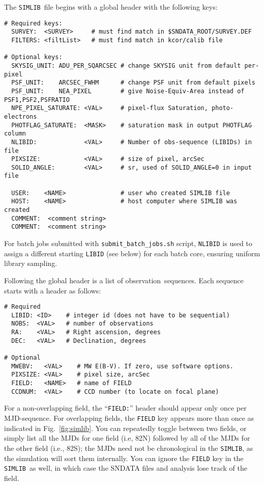 \documentclass[12pt]{article}
\newcommand{\simlib}{{\tt SIMLIB}}
\newcommand{\obs}{observation}
\newcommand{\submit}{\tt submit\_batch\_jobs.sh}
\begin{document}
{The \simlib\ file begins with a global header with the following
keys:
\begin{verbatim}
# Required keys:
  SURVEY:  <SURVEY>     # must find match in $SNDATA_ROOT/SURVEY.DEF
  FILTERS: <filtList>   # must find match in kcor/calib file 

# Optional keys:
  SKYSIG_UNIT: ADU_PER_SQARCSEC # change SKYSIG unit from default per-pixel
  PSF_UNIT:    ARCSEC_FWHM      # change PSF unit from default pixels
  PSF_UNIT:    NEA_PIXEL        # give Noise-Equiv-Area instead of PSF1,PSF2,PSFRATIO
  NPE_PIXEL_SATURATE: <VAL>     # pixel-flux Saturation, photo-electrons
  PHOTFLAG_SATURATE:  <MASK>    # saturation mask in output PHOTFLAG column
  NLIBID:             <VAL>     # Number of obs-sequence (LIBIDs) in file
  PIXSIZE:            <VAL>     # size of pixel, arcSec
  SOLID_ANGLE:        <VAL>     # sr, used of SOLID_ANGLE=0 in input file

  USER:    <NAME>               # user who created SIMLIB file
  HOST:    <NAME>               # host computer where SIMLIB was created
  COMMENT:  <comment string>
  COMMENT:  <comment string>
\end{verbatim} 
%
For batch jobs submitted with {\submit} script,
{\tt NLIBID} is used to assign a different starting {\tt LIBID}
(see below) for each batch core, ensuring uniform library sampling.

\clearpage
Following the global header is a list of \obs\ sequences.
Each sequence starts with a header as follows:
\begin{verbatim}
# Required
  LIBID: <ID>    # integer id (does not have to be sequential)
  NOBS:  <VAL>   # number of observations
  RA:    <VAL>   # Right ascension, degrees
  DEC:   <VAL>   # Declination, degrees

# Optional
  MWEBV:   <VAL>    # MW E(B-V). If zero, use software options.
  PIXSIZE: <VAL>    # pixel size, arcSec
  FIELD:   <NAME>   # name of FIELD
  CCDNUM:  <VAL>    # CCD number (to locate on focal plane)
\end{verbatim}
%
For a non-overlapping field, the ``{\tt FIELD:}'' header should appear
only once per MJD-sequence. For overlapping fields, 
the {\tt FIELD} key appears more than once as indicated
in Fig.~\ref{fig:simlib}.  You can repeatedly toggle between two fields, 
or simply list all the MJDs for one field (i.e, 82N) followed by all 
of the MJDs for the other field (i.e., 82S);
the MJDs need not be chronological in the \simlib, as the simulation
will sort them internally. You can ignore the {\tt FIELD} key in the
\simlib\ as well, in which case the SNDATA files and analysis lose
track of the field.


}
\end{document}
